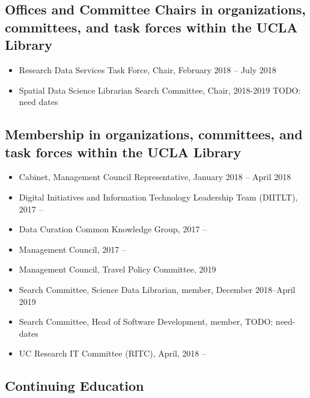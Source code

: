 
\subsection{Offices and Committee Chairs in organizations, committees, and task forces within the UCLA Library}

\begin{itemize}[label={},leftmargin=!,labelindent=5pt,itemindent=-15pt]
  \item Research Data Services Task Force, Chair, February 2018 – July 2018
  \item Spatial Data Science Librarian Search Committee, Chair, 2018-2019 TODO: need dates
\end{itemize}


\subsection{Membership in organizations, committees, and task forces within the UCLA Library}

\begin{itemize}[label={},leftmargin=!,labelindent=5pt,itemindent=-15pt]
    \item Cabinet, Management Council Representative, January 2018 -- April 2018
    \item Digital Initiatives and Information Technology Leadership Team (DIITLT), 2017 --
    \item Data Curation Common Knowledge Group, 2017 --
    \item Management Council, 2017 --
    \item Management Council, Travel Policy Committee, 2019
    \item Search Committee, Science Data Librarian, member, December 2018--April 2019
    \item Search Committee, Head of Software Development, member, TODO: need-dates
    \item UC Research IT Committee (RITC), April, 2018 --
\end{itemize}

\subsection{Continuing Education}

